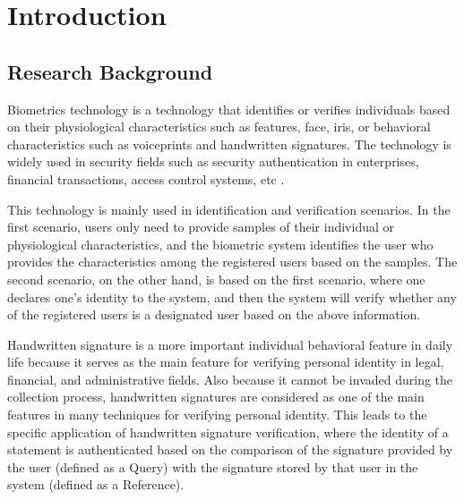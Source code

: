 \documentclass{article}
\begin{document}

\newpage




\tableofcontents

\newpage

\setcounter{page}{1}

\section{Introduction}
\subsection{Research Background}

Biometrics technology is a technology that identifies or verifies individuals based on their physiological characteristics such as features, face, iris, or behavioral characteristics such as voiceprints and handwritten signatures. The technology is widely used in security fields such as security authentication in enterprises, financial transactions, access control systems, etc \cite{1}.

This technology is mainly used in identification and verification scenarios. In the first scenario, users only need to provide samples of their individual or physiological characteristics, and the biometric system identifies the user who provides the characteristics among the registered users based on the samples. The second scenario, on the other hand, is based on the first scenario, where one declares one's identity to the system, and then the system will verify whether any of the registered users is a designated user based on the above information.

Handwritten signature is a more important individual behavioral feature in daily life because it serves as the main feature for verifying personal identity in legal, financial, and administrative fields. Also because it cannot be invaded during the collection process, handwritten signatures are considered as one of the main features in many techniques for verifying personal identity. This leads to the specific application of handwritten signature verification, where the identity of a statement is authenticated based on the comparison of the signature provided by the user (defined as a Query) with the signature stored by that user in the system (defined as a Reference).
\end{document}
